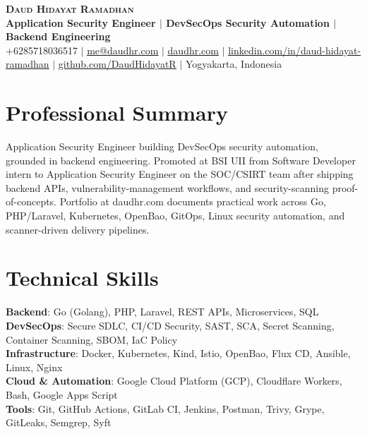 \documentclass[letterpaper,11pt]{article}
\begin{document}
\begin{center}
    \textbf{\Huge \scshape Daud Hidayat Ramadhan} \\ \vspace{1pt}
    \textbf{\large Application Security Engineer $|$ DevSecOps Security Automation $|$ Backend Engineering} \\ \vspace{1pt}
    \small +6285718036517 $|$
    \href{mailto:me@daudhr.com}{\underline{me@daudhr.com}} $|$
    \href{https://daudhr.com}{\underline{daudhr.com}} $|$
    \href{https://linkedin.com/in/daud-hidayat-ramadhan}{\underline{linkedin.com/in/daud-hidayat-ramadhan}} $|$
    \href{https://github.com/DaudHidayatR}{\underline{github.com/DaudHidayatR}} $|$
    Yogyakarta, Indonesia
\end{center}

\section{Professional Summary}
  \begin{minipage}[t]{\linewidth}
    \small
    Application Security Engineer building DevSecOps security automation,
    grounded in backend engineering. Promoted at BSI UII from Software
    Developer intern to Application Security Engineer on the SOC/CSIRT team
    after shipping backend APIs, vulnerability-management workflows, and
    security-scanning proof-of-concepts. Portfolio at daudhr.com documents
    practical work across Go, PHP/Laravel, Kubernetes, OpenBao, GitOps, Linux
    security automation, and scanner-driven delivery pipelines.
  \end{minipage}

\section{Technical Skills}
 \begin{itemize}[leftmargin=0.15in, label={}]
    \small{\item{
     \textbf{Backend}{: Go (Golang), PHP, Laravel, REST APIs, Microservices, SQL} \\
     \textbf{DevSecOps}{: Secure SDLC, CI/CD Security, SAST, SCA, Secret Scanning, Container Scanning, SBOM, IaC Policy} \\
     \textbf{Infrastructure}{: Docker, Kubernetes, Kind, Istio, OpenBao, Flux CD, Ansible, Linux, Nginx} \\
     \textbf{Cloud \& Automation}{: Google Cloud Platform (GCP), Cloudflare Workers, Bash, Google Apps Script} \\
     \textbf{Tools}{: Git, GitHub Actions, GitLab CI, Jenkins, Postman, Trivy, Grype, GitLeaks, Semgrep, Syft}
    }}
 \end{itemize}
\end{document}
